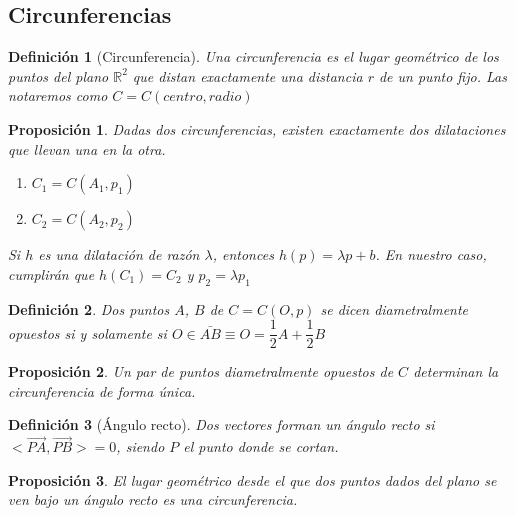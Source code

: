 \documentclass[11pt, a4paper, titlepage]{article}
\newcommand{\R}{\mathbb{R}}
\renewcommand{\vec}{\overrightarrow}
\theoremstyle{theorem-style}
\newtheorem*{nprop}{Proposición}
\theoremstyle{definition-style}
\newtheorem*{ndef}{Definición}
\theoremstyle{remark-style}
\newtheorem*{nota}{Nota}
\theoremstyle{example-style}
\begin{document}



\subsection{Circunferencias}

\begin{ndef}[Circunferencia]
  Una circunferencia es el lugar geométrico de los puntos del plano $\R^2$ que distan exactamente una distancia $r$ de un punto fijo. Las notaremos como $C = C(centro,radio)$
\end{ndef}

\begin{nprop}
  Dadas dos circunferencias, existen exactamente dos dilataciones que llevan una en la otra.
  \begin{enumerate}
  \item $C_1 = C(A_1,p_1)$
  \item $C_2 = C(A_2,p_2)$
  \end{enumerate}
  Si $h$ es una dilatación de razón $\lambda$, entonces $h(p) = \lambda p + b$.
  En nuestro caso, cumplirán que $h(C_1) = C_2$ y $p_2 = \lambda p_1$
\end{nprop}



\begin{ndef}
  Dos puntos $A$, $B$ de $C = C(O,p) $ se dicen diametralmente opuestos si y solamente si $O \in \bar{AB} \equiv O = \dfrac{1}{2}A + \dfrac{1}{2}B$
\end{ndef}


\begin{nprop}
  Un par de puntos diametralmente opuestos de $C$ determinan la circunferencia de forma única.
\end{nprop}

\begin{ndef}[Ángulo recto]
  Dos vectores forman un ángulo recto si $<\vec{PA},\vec{PB}> = 0$, siendo $P$ el punto donde se cortan.
\end{ndef}

\begin{nprop}
  El lugar geométrico desde el que dos puntos dados del plano se ven bajo un ángulo recto es una circunferencia.
\end{nprop}
\end{document}
